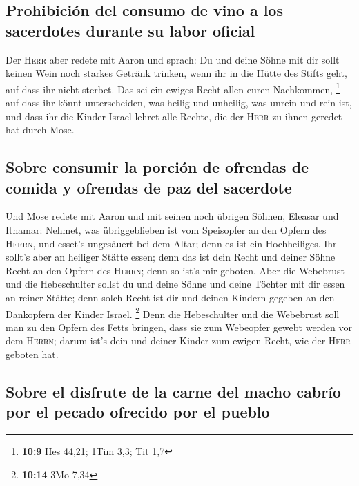 \hypertarget{prohibiciuxf3n-del-consumo-de-vino-a-los-sacerdotes-durante-su-labor-oficial}{%
\subsection{Prohibición del consumo de vino a los sacerdotes durante su
labor
oficial}\label{prohibiciuxf3n-del-consumo-de-vino-a-los-sacerdotes-durante-su-labor-oficial}}

 Der \textsc{Herr} aber redete mit Aaron und sprach:
 Du und deine Söhne mit dir sollt keinen Wein noch starkes
Getränk trinken, wenn ihr in die Hütte des Stifts geht, auf dass ihr
nicht sterbet. Das sei ein ewiges Recht allen euren Nachkommen,
\footnote{\textbf{10:9} Hes 44,21; 1Tim 3,3; Tit 1,7} 
auf dass ihr könnt unterscheiden, was heilig und unheilig, was unrein
und rein ist,  und dass ihr die Kinder Israel lehret alle
Rechte, die der \textsc{Herr} zu ihnen geredet hat durch Mose.

\hypertarget{sobre-consumir-la-porciuxf3n-de-ofrendas-de-comida-y-ofrendas-de-paz-del-sacerdote}{%
\subsection{Sobre consumir la porción de ofrendas de comida y ofrendas
de paz del
sacerdote}\label{sobre-consumir-la-porciuxf3n-de-ofrendas-de-comida-y-ofrendas-de-paz-del-sacerdote}}

 Und Mose redete mit Aaron und mit seinen noch übrigen
Söhnen, Eleasar und Ithamar: Nehmet, was übriggeblieben ist vom
Speisopfer an den Opfern des \textsc{Herrn}, und esset's ungesäuert bei
dem Altar; denn es ist ein Hochheiliges.  Ihr sollt's
aber an heiliger Stätte essen; denn das ist dein Recht und deiner Söhne
Recht an den Opfern des \textsc{Herrn}; denn so ist's mir geboten.
 Aber die Webebrust und die Hebeschulter sollst du und
deine Söhne und deine Töchter mit dir essen an reiner Stätte; denn solch
Recht ist dir und deinen Kindern gegeben an den Dankopfern der Kinder
Israel. \footnote{\textbf{10:14} 3Mo 7,34}  Denn die
Hebeschulter und die Webebrust soll man zu den Opfern des Fetts bringen,
dass sie zum Webeopfer gewebt werden vor dem \textsc{Herrn}; darum ist's
dein und deiner Kinder zum ewigen Recht, wie der \textsc{Herr} geboten
hat.

\hypertarget{sobre-el-disfrute-de-la-carne-del-macho-cabruxedo-por-el-pecado-ofrecido-por-el-pueblo}{%
\subsection{Sobre el disfrute de la carne del macho cabrío por el pecado
ofrecido por el
pueblo}\label{sobre-el-disfrute-de-la-carne-del-macho-cabruxedo-por-el-pecado-ofrecido-por-el-pueblo}}

